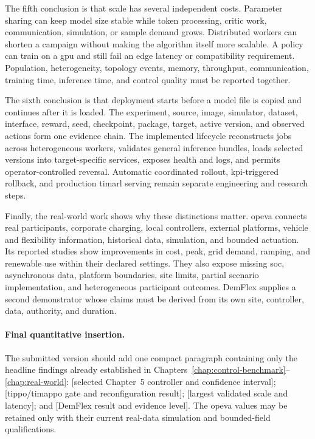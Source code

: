 The fifth conclusion is that scale has several independent costs. Parameter sharing can keep model size stable while token processing, critic work, communication, simulation, or sample demand grows. Distributed workers can shorten a campaign without making the algorithm itself more scalable. A policy can train on a \gls{gpu} and still fail an edge latency or compatibility requirement. Population, heterogeneity, topology events, memory, throughput, communication, training time, inference time, and control quality must be reported together.

The sixth conclusion is that deployment starts before a model file is copied and continues after it is loaded. The experiment, source, image, simulator, dataset, interface, reward, seed, checkpoint, package, target, active version, and observed actions form one evidence chain. The implemented lifecycle reconstructs jobs across heterogeneous workers, validates general inference bundles, loads selected versions into target-specific services, exposes health and logs, and permits operator-controlled reversal. Automatic coordinated rollout, \gls{kpi}-triggered rollback, and production \gls{timarl} serving remain separate engineering and research steps.

Finally, the real-world work shows why these distinctions matter. \gls{opeva} connects real participants, corporate charging, local controllers, external platforms, vehicle and flexibility information, historical data, simulation, and bounded actuation. Its reported studies show improvements in cost, peak, grid demand, ramping, and renewable use within their declared settings. They also expose missing \gls{soc}, asynchronous data, platform boundaries, site limits, partial scenario implementation, and heterogeneous participant outcomes. DemFlex supplies a second demonstrator whose claims must be derived from its own site, controller, data, authority, and duration.

\begin{draftonly}
\paragraph{Final quantitative insertion.}
The submitted version should add one compact paragraph containing only the headline findings already established in Chapters~\ref{chap:control-benchmark}--\ref{chap:real-world}: [selected Chapter~5 controller and confidence interval]; [\gls{tippo}/\gls{timappo} gate and reconfiguration result]; [largest validated scale and latency]; and [DemFlex result and evidence level]. The \gls{opeva} values may be retained only with their current real-data simulation and bounded-field qualifications.
\end{draftonly}

